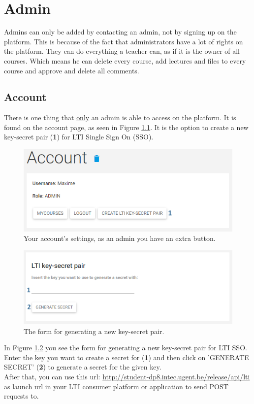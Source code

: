 \documentclass[a4paper,11pt]{report}
\begin{document}
\chapter{Admin}
Admins can only be added by contacting an admin, not by signing up on the platform. This is because of the fact that administrators have a lot of rights on the platform. They can do everything a teacher can, as if it is the owner of all courses. Which means he can delete every course, add lectures and files to every course and approve and delete all comments.

\section{Account}

There is one thing that \underline{only} an admin is able to access on the platform. It is found on the account page, as seen in Figure \ref{fig:adm_create_pair}. It is the option to create a new key-secret pair (\textbf{1}) for LTI Single Sign On (SSO).

\begin{figure}[H]
\centering
\includegraphics[scale=0.6]{imgs/adm_create_pair.png}
\caption{Your account's settings, as an admin you have an extra button.}
\label{fig:adm_create_pair}
\end{figure}

\begin{figure}[H]
\centering
\includegraphics[scale=0.6]{imgs/adm_gen_secret.png}
\caption{The form for generating a new key-secret pair.}
\label{fig:adm_gen_secret}
\end{figure}

In Figure \ref{fig:adm_gen_secret} you see the form for generating a new key-secret pair for LTI SSO.
Enter the key you want to create a secret for (\textbf{1}) and then click on 'GENERATE SECRET' (\textbf{2}) to generate a secret for the given key.\\

After that, you can use this url: \url{http://student-dp8.intec.ugent.be/release/api/lti} as launch url in your LTI consumer platform or application to send POST requests to.

\endgroup
\end{document}
